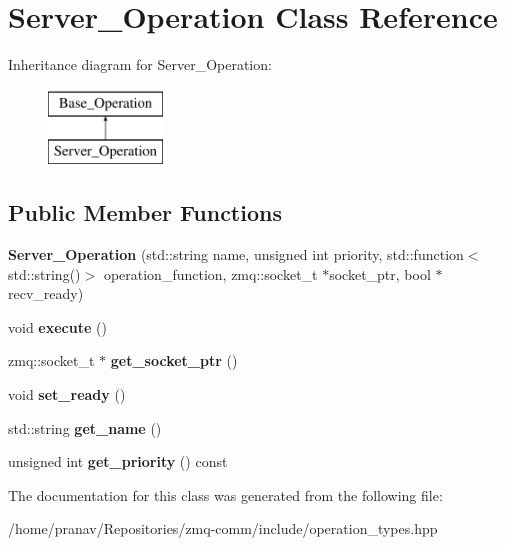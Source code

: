 \hypertarget{classServer__Operation}{}\section{Server\+\_\+\+Operation Class Reference}
\label{classServer__Operation}
Inheritance diagram for Server\+\_\+\+Operation\+:\begin{figure}[H]
\begin{center}
\leavevmode
\includegraphics[height=2.000000cm]{classServer__Operation}
\end{center}
\end{figure}
\subsection*{Public Member Functions}
\begin{DoxyCompactItemize}
\item 
{\bfseries Server\+\_\+\+Operation} (std\+::string name, unsigned int priority, std\+::function$<$ std\+::string()$>$ operation\+\_\+function, zmq\+::socket\+\_\+t $\ast$socket\+\_\+ptr, bool $\ast$recv\+\_\+ready)\hypertarget{classServer__Operation_a2f23da94de8bbec78ed8ed31a10bc59e}{}\label{classServer__Operation_a2f23da94de8bbec78ed8ed31a10bc59e}

\item 
void {\bfseries execute} ()\hypertarget{classServer__Operation_a5f9fd79477344d73687d6b566e6b9a02}{}\label{classServer__Operation_a5f9fd79477344d73687d6b566e6b9a02}

\item 
zmq\+::socket\+\_\+t $\ast$ {\bfseries get\+\_\+socket\+\_\+ptr} ()\hypertarget{classServer__Operation_a6209f8ceaf75bbdbf7a9d1666fc07957}{}\label{classServer__Operation_a6209f8ceaf75bbdbf7a9d1666fc07957}

\item 
void {\bfseries set\+\_\+ready} ()\hypertarget{classServer__Operation_a47b181b85afb6f791128c34b6ebefc3b}{}\label{classServer__Operation_a47b181b85afb6f791128c34b6ebefc3b}

\item 
std\+::string {\bfseries get\+\_\+name} ()\hypertarget{classBase__Operation_a878dd0e855a78907e4c828b1d70587d0}{}\label{classBase__Operation_a878dd0e855a78907e4c828b1d70587d0}

\item 
unsigned int {\bfseries get\+\_\+priority} () const \hypertarget{classBase__Operation_a0d561f85d2454f7c5abbe9d0e264a98a}{}\label{classBase__Operation_a0d561f85d2454f7c5abbe9d0e264a98a}

\end{DoxyCompactItemize}


The documentation for this class was generated from the following file\+:\begin{DoxyCompactItemize}
\item 
/home/pranav/\+Repositories/zmq-\/comm/include/operation\+\_\+types.\+hpp\end{DoxyCompactItemize}
